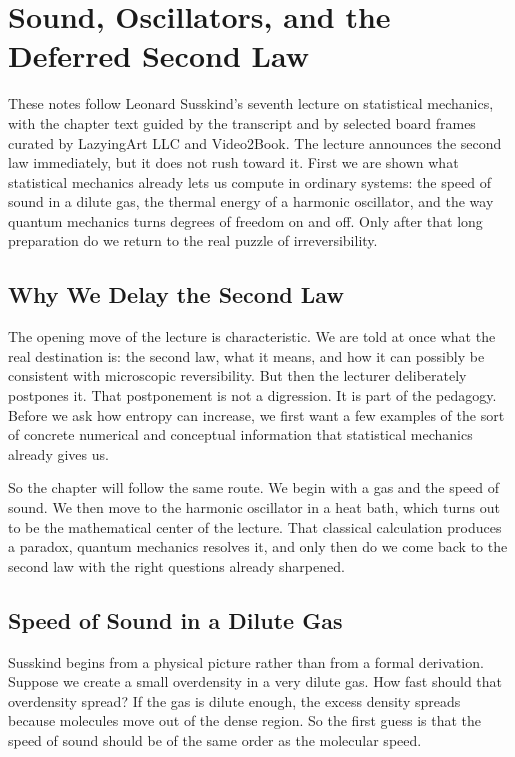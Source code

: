 \chapter{Sound, Oscillators, and the Deferred Second Law}

These notes follow Leonard Susskind's seventh lecture on statistical mechanics, with the chapter text guided by the transcript and by selected board frames curated by LazyingArt LLC and Video2Book. The lecture announces the second law immediately, but it does not rush toward it. First we are shown what statistical mechanics already lets us compute in ordinary systems: the speed of sound in a dilute gas, the thermal energy of a harmonic oscillator, and the way quantum mechanics turns degrees of freedom on and off. Only after that long preparation do we return to the real puzzle of irreversibility.

\section{Why We Delay the Second Law}

The opening move of the lecture is characteristic. We are told at once what the real destination is: the second law, what it means, and how it can possibly be consistent with microscopic reversibility. But then the lecturer deliberately postpones it. That postponement is not a digression. It is part of the pedagogy. Before we ask how entropy can increase, we first want a few examples of the sort of concrete numerical and conceptual information that statistical mechanics already gives us.

So the chapter will follow the same route. We begin with a gas and the speed of sound. We then move to the harmonic oscillator in a heat bath, which turns out to be the mathematical center of the lecture. That classical calculation produces a paradox, quantum mechanics resolves it, and only then do we come back to the second law with the right questions already sharpened.

\section{Speed of Sound in a Dilute Gas}

Susskind begins from a physical picture rather than from a formal derivation. Suppose we create a small overdensity in a very dilute gas. How fast should that overdensity spread? If the gas is dilute enough, the excess density spreads because molecules move out of the dense region. So the first guess is that the speed of sound should be of the same order as the molecular speed.


